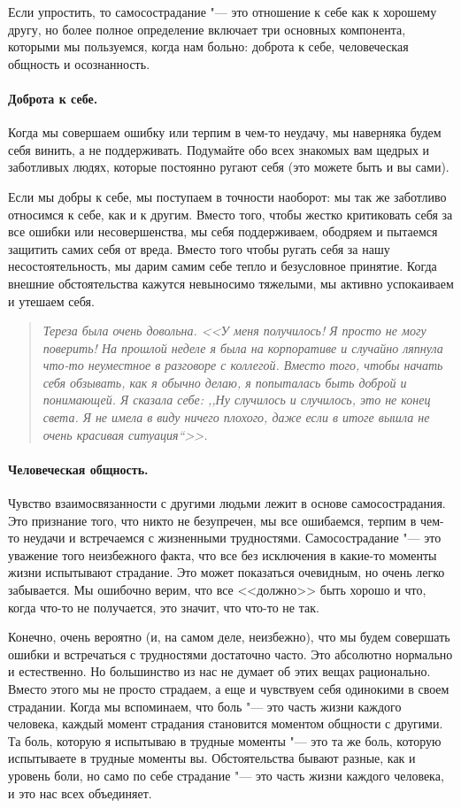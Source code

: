 Если упростить, то самосострадание "--- это отношение к себе как к хорошему другу, но более полное определение включает три основных компонента, которыми мы пользуемся, когда нам больно: доброта к себе, человеческая общность и осознанность.

\paragraph{Доброта к себе.} 
Когда мы совершаем ошибку или терпим в чем-то неудачу, мы наверняка будем себя винить, а не поддерживать. Подумайте обо всех знакомых вам щедрых и заботливых людях, которые постоянно ругают себя (это можете быть и вы сами). 

Если мы добры к себе, мы поступаем в точности наоборот: мы так же заботливо относимся к себе, как и к другим. Вместо того, чтобы жестко критиковать себя за все ошибки или несовершенства, мы себя поддерживаем, ободряем и пытаемся защитить самих себя от вреда. Вместо того чтобы ругать себя за нашу несостоятельность, мы дарим самим себе тепло и безусловное принятие. Когда внешние обстоятельства кажутся невыносимо тяжелыми, мы активно успокаиваем и утешаем себя. 

\begin{quote}
	\textit{Тереза была очень довольна. <<У меня получилось! Я просто не могу поверить! На прошлой неделе я была на корпоративе и случайно ляпнула  что-то неуместное в разговоре с коллегой. Вместо того, чтобы начать себя обзывать, как я обычно делаю, я попыталась быть доброй и понимающей. Я сказала себе: ,,Ну случилось и случилось, это не конец света. Я не имела в виду ничего плохого, даже если в итоге вышла не очень красивая ситуация``>>.}
\end{quote}

\paragraph{Человеческая общность.}
 Чувство взаимосвязанности с другими людьми лежит в основе самосострадания. Это признание того, что никто не безупречен, мы все ошибаемся, терпим в чем-то неудачи и встречаемся с жизненными трудностями. Самосострадание "--- это уважение того неизбежного факта, что все без исключения в какие-то моменты жизни испытывают страдание. Это может показаться очевидным, но очень легко забывается. Мы ошибочно верим, что все <<должно>> быть хорошо и что, когда что-то не получается, это значит, что что-то не так. 

Конечно, очень вероятно (и, на самом деле, неизбежно), что мы будем совершать ошибки и встречаться с трудностями достаточно часто. Это абсолютно нормально и естественно. Но большинство из нас не думает об этих вещах рационально. Вместо этого мы не просто страдаем, а еще и чувствуем себя одинокими в своем страдании. Когда мы вспоминаем, что боль "--- это часть жизни каждого человека, каждый момент страдания становится моментом общности с другими. Та боль, которую я испытываю в трудные моменты "--- это та же боль, которую испытываете в трудные моменты вы. Обстоятельства бывают разные, как и уровень боли, но само по себе страдание "--- это часть жизни каждого человека, и это нас всех объединяет. 

